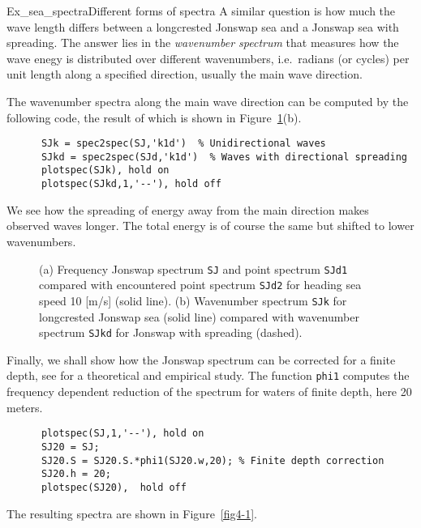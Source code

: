 \begin{rtex}{Ex_sea_spectra}{Different forms of spectra}
A similar question is how much the
wave length differs between a longcrested {\sc Jonswap} sea
and a {\sc Jonswap} sea with spreading. The answer lies in 
the {\it wavenumber spectrum}
that measures how the wave enegy is distributed over different 
wavenumbers, i.e.\ radians (or cycles)  
per unit length along a specified direction, usually the main wave direction. 

The wavenumber spectra along the main wave direction 
can be computed by the following  code,
the result of which is shown in Figure~\ref{fig4-4}(b).
{\small\begin{verbatim}
      SJk = spec2spec(SJ,'k1d')  % Unidirectional waves
      SJkd = spec2spec(SJd,'k1d')  % Waves with directional spreading 
      plotspec(SJk), hold on
      plotspec(SJkd,1,'--'), hold off
\end{verbatim}}
\noindent We see how the spreading of energy away from the main direction 
makes observed waves longer. The total energy is of course the same but 
shifted to lower wavenumbers.   

\begin{figure}[tbh]
%
\hfill
{}%
\vspace{-3mm}
\caption[Comparing different forms of spectra]{
 (a) Frequency {\sc Jonswap} spectrum {\tt SJ} and point spectrum 	
 {\tt SJd1} compared with encountered point 
 spectrum {\tt SJd2} for heading sea speed 10 [m/s] (solid line).
(b) Wavenumber spectrum {\tt SJk} for longcrested {\sc Jonswap} sea
(solid line) compared with wavenumber spectrum {\tt SJkd} 
for {\sc Jonswap} with spreading (dashed).
}
  \label{fig4-4}
\end{figure}

Finally, we shall show how the {\sc Jonswap} spectrum
can be corrected  for a finite depth, see \cite{BuowsEtal1985Similarity} for a 
theoretical and empirical study.
The \progname{} function {\tt phi1} computes the frequency dependent 
reduction of the spectrum for waters of finite depth, here 20 meters.
{\small\begin{verbatim}
      plotspec(SJ,1,'--'), hold on
      SJ20 = SJ;
      SJ20.S = SJ20.S.*phi1(SJ20.w,20); % Finite depth correction
      SJ20.h = 20;
      plotspec(SJ20),  hold off
\end{verbatim}} 
\noindent The resulting spectra are shown in Figure~\ref{fig4-1}.
\end{rtex}
